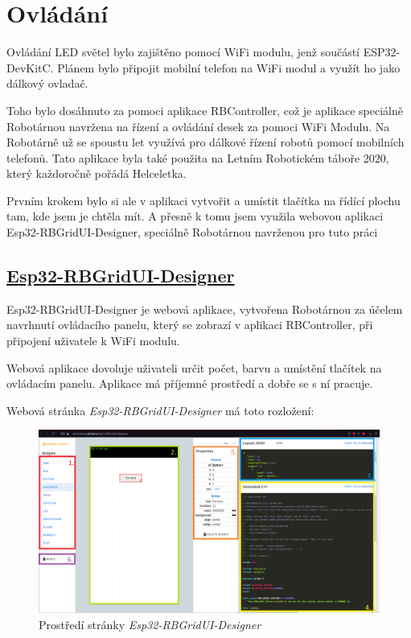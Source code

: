 \chapter{Ovládání}
Ovládání LED světel bylo zajištěno pomocí WiFi modulu, jenž součástí ESP32-DevKitC. Plánem bylo připojit mobilní telefon na WiFi modul a využít ho jako dálkový ovladač. 

Toho bylo dosáhnuto za pomoci aplikace RBController, což je aplikace speciálně Robotárnou navržena na řízení a ovládání desek za pomoci WiFi Modulu. Na Robotárně už se spoustu let využívá pro dálkové řízení robotů pomocí mobilních telefonů. Tato aplikace byla také použita na Letním Robotickém táboře 2020, který každoročně pořádá Helceletka.

Prvním krokem bylo si ale v aplikaci vytvořit a umístit tlačítka na řídící plochu tam, kde jsem je chtěla mít. A přesně k tomu jsem využila webovou aplikaci Esp32-RBGridUI-Designer, speciálně Robotárnou navrženou pro tuto práci


\section{\href{https://roboticsbrno.github.io/Esp32-RBGridUI-Designer/}{Esp32-RBGridUI-Designer}} 
Esp32-RBGridUI-Designer je webová aplikace, vytvořena Robotárnou za účelem navrhnutí ovládacího panelu, který se zobrazí v aplikaci RBController, při připojení uživatele k WiFi modulu. 

Webová aplikace dovoluje uživateli určit počet, barvu a umístění tlačítek na ovládacím panelu. Aplikace má příjemné prostředí a dobře se s ní pracuje. 

Webová stránka {\em Esp32-RBGridUI-Designer} má toto rozložení: 


\begin{figure}[htbp]
	\centering
	\includegraphics[width=1\textwidth]{img/Esp32-RBGridUI-Designer.png}
	\caption{Prostředí stránky {\em Esp32-RBGridUI-Designer}}
\end{figure}

